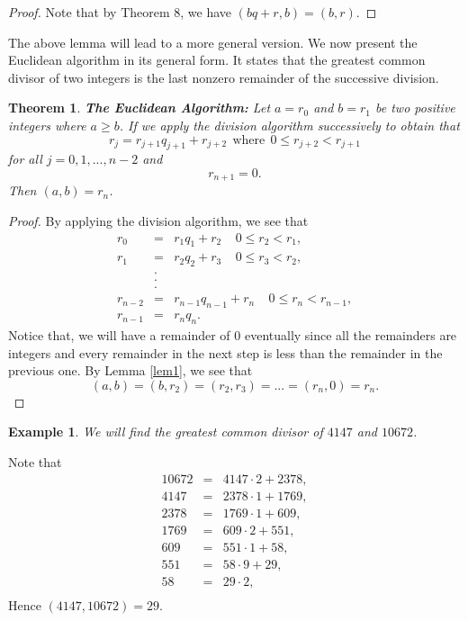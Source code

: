 \documentclass[12pt,letterpaper]{book}
\newtheorem{theorem}{Theorem}
\newtheorem{example}{Example}
\begin{document}
\begin{proof}
Note that by Theorem 8, we have $(bq+r,b)=(b,r)$.
\end{proof}
The above lemma will lead to a more general version.  We now
present the Euclidean algorithm in its general form.  It states that
the greatest common divisor of two integers is the last nonzero
remainder of the successive division. 
\begin{theorem}\textbf{The Euclidean Algorithm:}  
Let $a=r_0$ and $b=r_1$ be two positive integers where $a\geq b$. If
we apply the division algorithm successively to obtain that
\begin{equation*}
r_j=r_{j+1}q_{j+1}+r_{j+2} \ \ \mbox{where} \ \  0\leq
r_{j+2}<r_{j+1}
\end{equation*}
for all $j=0,1,...,n-2$ and
\begin{equation*}
r_{n+1}=0.
\end{equation*}
Then $(a,b)=r_{n}$.
\end{theorem}

\begin{proof}
By applying the division algorithm, we see that
\begin{eqnarray*}
r_0&=&r_1q_1+r_2 \ \ \ \ \ 0\leq r_2<r_1, \\
r_1&=&r_2q_2+r_3 \ \ \ \ \ 0\leq r_3<r_2, \\
 &.&    \\
 &.&    \\
&.&    \\
r_{n-2}&=&r_{n-1}q_{n-1}+r_{n} \ \ \ \ \ 0\leq r_{n}<r_{n-1}, \\
r_{n-1}&=&r_{n}q_{n}.
\end{eqnarray*}
Notice that, we will have a remainder of $0$ eventually since all
the remainders are integers and every remainder in the next step is
less than the remainder in the previous one.  By Lemma \ref{lem1},
we see that
\begin{equation*}
(a,b)=(b,r_2)=(r_2,r_3)=...=(r_n,0)=r_n.
\end{equation*}
\end{proof}

\begin{example}
We will find the greatest common divisor of $4147$ and $10672$.\\
\end{example}
Note that
\begin{eqnarray*}
 10672&=&4147\cdot 2+2378,\\
 4147&=&2378\cdot 1+1769,\\
2378&=&1769\cdot 1+609,\\
1769&=&609\cdot 2 +551,\\
609&=& 551\cdot 1+58, \\
551&=&58\cdot 9+ 29,\\
 58&=&29\cdot 2,\\
\end{eqnarray*}
Hence $(4147,10672)=29.$
\end{document}

